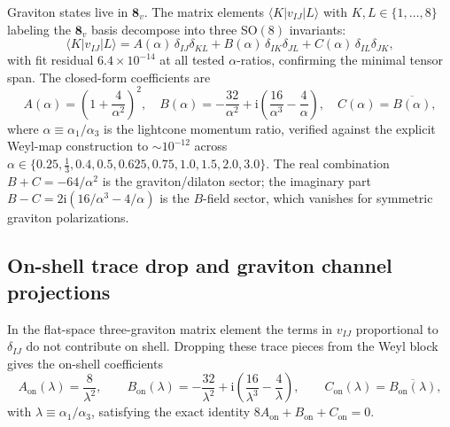 \documentclass[11pt]{article}
\newcommand{\ii}{\mathrm{i}}
\begin{document}
Graviton states live in $\mathbf{8}_v$. The matrix elements $\langle K|v_{IJ}|L\rangle$ with $K, L \in \{1, \dots, 8\}$ labeling the $\mathbf{8}_v$ basis decompose into three SO$(8)$ invariants:
\begin{equation}
\langle K|v_{IJ}|L\rangle = A(\alpha)\,\delta_{IJ}\delta_{KL} + B(\alpha)\,\delta_{IK}\delta_{JL} + C(\alpha)\,\delta_{IL}\delta_{JK},
\label{eq:vij-8v}
\end{equation}
with fit residual $6.4 \times 10^{-14}$ at all tested $\alpha$-ratios, confirming the minimal tensor span. The closed-form coefficients are
\begin{equation}
\boxed{
A(\alpha) = \left(1 + \frac{4}{\alpha^2}\right)^{\!2},
\quad
B(\alpha) = -\frac{32}{\alpha^2} + \ii\!\left(\frac{16}{\alpha^3} - \frac{4}{\alpha}\right),
\quad
C(\alpha) = \overline{B(\alpha)},
}
\label{eq:weyl}
\end{equation}
where $\alpha \equiv \alpha_1/\alpha_3$ is the lightcone momentum ratio, verified against the explicit Weyl-map construction to $\sim\!10^{-12}$ across $\alpha \in \{0.25, \tfrac{1}{3}, 0.4, 0.5, 0.625, 0.75, 1.0, 1.5, 2.0, 3.0\}$. The real combination $B + C = -64/\alpha^2$ is the graviton/dilaton sector; the imaginary part $B - C = 2\ii(16/\alpha^3 - 4/\alpha)$ is the $B$-field sector, which vanishes for symmetric graviton polarizations.

\subsection{On-shell trace drop and graviton channel projections}

In the flat-space three-graviton matrix element the terms in $v_{IJ}$ proportional to $\delta_{IJ}$ do not contribute on shell. Dropping these trace pieces from the Weyl block gives the on-shell coefficients
\begin{equation}
A_{\mathrm{on}}(\lambda) = \frac{8}{\lambda^2},
\qquad
B_{\mathrm{on}}(\lambda) = -\frac{32}{\lambda^2} + \ii\!\left(\frac{16}{\lambda^3} - \frac{4}{\lambda}\right),
\qquad
C_{\mathrm{on}}(\lambda) = \overline{B_{\mathrm{on}}(\lambda)},
\label{eq:on-shell-weyl}
\end{equation}
with $\lambda \equiv \alpha_1/\alpha_3$, satisfying the exact identity $8A_{\mathrm{on}} + B_{\mathrm{on}} + C_{\mathrm{on}} = 0$.
\end{document}
